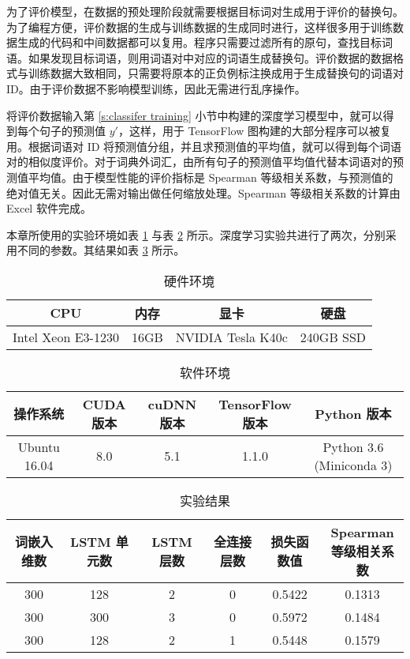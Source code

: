 为了评价模型，在数据的预处理阶段就需要根据目标词对生成用于评价的替换句。为了编程方便，评价数据的生成与训练数据的生成同时进行，这样很多用于训练数据生成的代码和中间数据都可以复用。程序只需要过滤所有的原句，查找目标词语。如果发现目标词语，则用词语对中对应的词语生成替换句。评价数据的数据格式与训练数据大致相同，只需要将原本的正负例标注换成用于生成替换句的词语对 ID。由于评价数据不影响模型训练，因此无需进行乱序操作。

将评价数据输入第 \ref{s:classifer training} 小节中构建的深度学习模型中，就可以得到每个句子的预测值 $y'$，这样，用于 TensorFlow 图构建的大部分程序可以被复用。根据词语对 ID 将预测值分组，并且求预测值的平均值，就可以得到每个词语对的相似度评价。对于词典外词汇，由所有句子的预测值平均值代替本词语对的预测值平均值。由于模型性能的评价指标是 Spearman 等级相关系数，与预测值的绝对值无关。因此无需对输出做任何缩放处理。Spearman 等级相关系数的计算由 Excel 软件完成。

本章所使用的实验环境如表 \ref{t:hw environment} 与表 \ref{t:sw environment} 所示。深度学习实验共进行了两次，分别采用不同的参数。其结果如表 \ref{t:classifer result} 所示。
\begin{table}[h]
	\caption{硬件环境}
	\label{t:hw environment}
	\vspace{0.5em}\centering\wuhao
	\begin{tabular}{cccc}
		\toprule[1.5pt]
		CPU & 内存 & 显卡 & 硬盘 \\
		\midrule[1pt]
		Intel Xeon E3-1230 & 16GB & NVIDIA Tesla K40c & 240GB SSD \\
		\bottomrule[1.5pt]
	\end{tabular}
\end{table}

\begin{table}[h]
	\caption{软件环境}
	\label{t:sw environment}
	\vspace{0.5em}\centering\wuhao
	\begin{tabular}{ccccc}
		\toprule[1.5pt]
		操作系统 & CUDA 版本 & cuDNN 版本 & TensorFlow 版本 & Python 版本 \\
		\midrule[1pt]
		Ubuntu 16.04 & 8.0 & 5.1 & 1.1.0 & Python 3.6 (Miniconda 3) \\
		\bottomrule[1.5pt]
	\end{tabular}
\end{table}


\begin{table}[h]
	\caption{实验结果}
	\label{t:classifer result}
	\vspace{0.5em}\centering\wuhao
	\begin{tabular}{cccccc}
		\toprule[1.5pt]
		词嵌入维数 & LSTM 单元数 & LSTM 层数 & 全连接层数 & 损失函数值 & \makecell{Spearman \\ 等级相关系数} \\
		\midrule[1pt]
		300 & 128 & 2 & 0 & 0.5422 & 0.1313 \\
		300 & 300 & 3 & 0 & 0.5972 & 0.1484 \\
		300 & 128 & 2 & 1 & 0.5448 & 0.1579 \\
		\bottomrule[1.5pt]
	\end{tabular}
\end{table}


